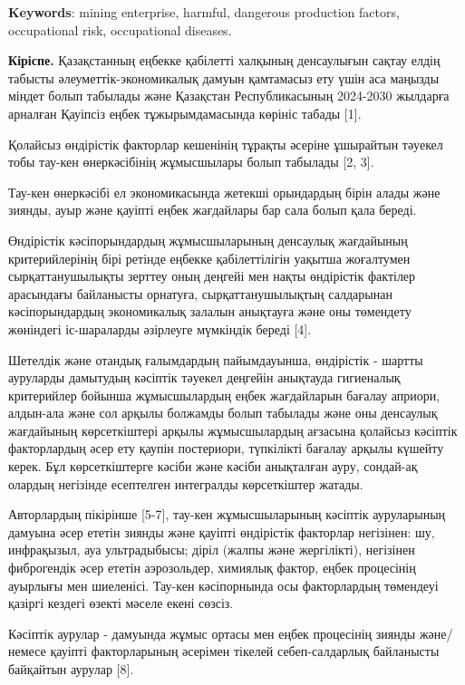 {\bfseries Keywords}: mining enterprise, harmful, dangerous production
factors, occupational risk, occupational diseases.

\begin{multicols}{2}
{\bfseries Кіріспе.} Қазақстанның еңбекке қабілетті халқының денсаулығын
сақтау елдің табысты әлеуметтік-экономикалық дамуын қамтамасыз ету үшін
аса маңызды міндет болып табылады және Қазақстан Республикасының
2024-2030 жылдарға арналған Қауіпсіз еңбек тұжырымдамасында көрініс
табады {[}1{]}.

Қолайсыз өндірістік факторлар кешенінің тұрақты әсеріне ұшырайтын
тәуекел тобы тау-кен өнеркәсібінің жұмысшылары болып табылады {[}2,
3{]}.

Тау-кен өнеркәсібі ел экономикасында жетекші орындардың бірін алады және
зиянды, ауыр және қауіпті еңбек жағдайлары бар сала болып қала береді.

Өндірістік кәсіпорындардың жұмысшыларының денсаулық жағдайының
критерийлерінің бірі ретінде еңбекке қабілеттілігін уақытша жоғалтумен
сырқаттанушылықты зерттеу оның деңгейі мен нақты өндірістік фактілер
арасындағы байланысты орнатуға, сырқаттанушылықтың салдарынан
кәсіпорындардың экономикалық залалын анықтауға және оны төмендету
жөніндегі іс-шараларды әзірлеуге мүмкіндік береді {[}4{]}.

Шетелдік және отандық ғалымдардың пайымдауынша, өндірістік - шартты
ауруларды дамытудың кәсіптік тәуекел деңгейін анықтауда гигиеналық
критерийлер бойынша жұмысшылардың еңбек жағдайларын бағалау априори,
алдын-ала және сол арқылы болжамды болып табылады және оны денсаулық
жағдайының көрсеткіштері арқылы жұмысшылардың ағзасына қолайсыз кәсіптік
факторлардың әсер ету қаупін постериори, түпкілікті бағалау арқылы
күшейту керек. Бұл көрсеткіштерге кәсіби және кәсіби анықталған ауру,
сондай-ақ олардың негізінде есептелген интегралды көрсеткіштер жатады.

Авторлардың пікірінше {[}5-7{]}, тау-кен жұмысшыларының кәсіптік
ауруларының дамуына әсер ететін зиянды және қауіпті өндірістік факторлар
негізінен: шу, инфрақызыл, ауа ультрадыбысы; діріл (жалпы және
жергілікті), негізінен фиброгендік әсер ететін аэрозольдер, химиялық
фактор, еңбек процесінің ауырлығы мен шиеленісі. Тау-кен кәсіпорнында
осы факторлардың төмендеуі қазіргі кездегі өзекті мәселе екені сөзсіз.

Кәсіптік аурулар - дамуында жұмыс ортасы мен еңбек процесінің зиянды
және/немесе қауіпті факторларының әсерімен тікелей себеп-салдарлық
байланысты байқайтын аурулар {[}8{]}.


\end{multicols}
